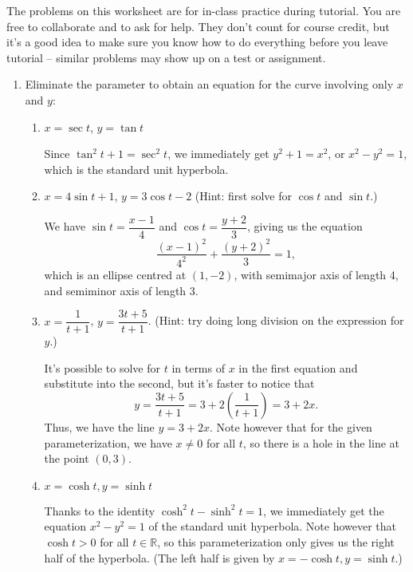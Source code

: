 \documentclass[12pt]{article}
\newcommand{\R}{\mathbb{R}}
\begin{document}
\thispagestyle{fancy}
The problems on this worksheet are for in-class practice during tutorial. You are free to collaborate and to ask for help. They don't count for course credit, but it's a good idea to make sure you know how to do everything before you leave tutorial -- similar problems may show up on a test or assignment.

\begin{enumerate}
 \item Eliminate the parameter to obtain an equation for the curve involving only $x$ and $y$:
\begin{enumerate}
 \item $x=\sec t$, $y=\tan t$

\medskip

Since $\tan^2 t+1 = \sec^2 t$, we immediately get $y^2+1=x^2$, or $x^2-y^2=1$, which is the standard unit hyperbola.

 \item $x=4\sin t+1$, $y=3\cos t-2$ (Hint: first solve for $\cos t$ and $\sin t$.)

\medskip

We have $\sin t = \dfrac{x-1}{4}$ and $\cos t = \dfrac{y+2}{3}$, giving us the equation
\[
\dfrac{(x-1)^2}{4^2}+\dfrac{(y+2)^2}{3}=1, 
\]
which is an ellipse centred at $(1,-2)$, with semimajor axis of length 4, and semiminor axis of length 3.

 \item $x=\dfrac{1}{t+1}$, $y=\dfrac{3t+5}{t+1}$. (Hint: try doing long division on the expression for $y$.)

\medskip

It's possible to solve for $t$ in terms of $x$ in the first equation and substitute into the second, but it's faster to notice that
\[
 y = \dfrac{3t+5}{t+1} = 3+2\left(\frac{1}{t+1}\right) = 3+2x.
\]
Thus, we have the line $y=3+2x$. Note however that for the given parameterization, we have $x\neq 0$ for all $t$, so there is a hole in the line at the point $(0,3)$.

 \item $x=\cosh t, y=\sinh t$

\medskip

Thanks to the identity $\cosh^2t-\sinh^2t=1$, we immediately get the equation $x^2-y^2=1$ of the standard unit hyperbola. Note however that $\cosh t>0$ for all $t\in\R$, so this parameterization only gives us the right half of the hyperbola. (The left half is given by $x=-\cosh t, y=\sinh t$.)
\end{enumerate}
 

\end{enumerate}
\end{document}
